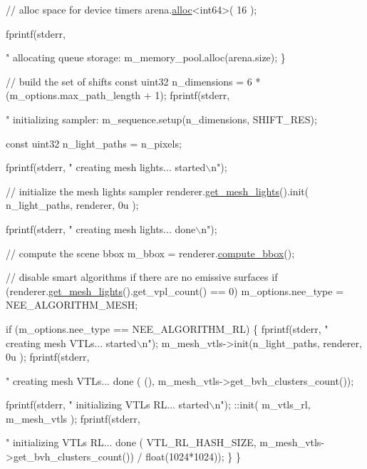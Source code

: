 \begin{DoxyCodeInclude}
{{{{{{{{{{{{        \textcolor{comment}{// alloc space for device timers}
        arena.\hyperlink{structcugar_1_1memory__arena_afcbc6673ae3fa3e61368495ed2041621}{alloc}<int64>( 16 );

        fprintf(stderr, \textcolor{stringliteral}{"  allocating queue storage: %
        m\_memory\_pool.alloc(arena.size);
    \}

    \textcolor{comment}{// build the set of shifts}
    \textcolor{keyword}{const} uint32 n\_dimensions = 6 * (m\_options.max\_path\_length + 1);
    fprintf(stderr, \textcolor{stringliteral}{"  initializing sampler: %
    m\_sequence.setup(n\_dimensions, SHIFT\_RES);

    \textcolor{keyword}{const} uint32 n\_light\_paths = n\_pixels;

    fprintf(stderr, \textcolor{stringliteral}{"  creating mesh lights... started\(\backslash\)n"});

    \textcolor{comment}{// initialize the mesh lights sampler}
    renderer.\hyperlink{struct_rendering_context_a076d2a2c86696da228fc6a49d55910ee}{get\_mesh\_lights}().init( n\_light\_paths, renderer, 0u );

    fprintf(stderr, \textcolor{stringliteral}{"  creating mesh lights... done\(\backslash\)n"});

    \textcolor{comment}{// compute the scene bbox}
    m\_bbox = renderer.\hyperlink{struct_rendering_context_acb44a2881eb6cf851f53428705a3351f}{compute\_bbox}();

    \textcolor{comment}{// disable smart algorithms if there are no emissive surfaces}
    \textcolor{keywordflow}{if} (renderer.\hyperlink{struct_rendering_context_a076d2a2c86696da228fc6a49d55910ee}{get\_mesh\_lights}().get\_vpl\_count() == 0)
        m\_options.nee\_type = NEE\_ALGORITHM\_MESH;

    if (m\_options.nee\_type == NEE\_ALGORITHM\_RL)
    \{
        fprintf(stderr, \textcolor{stringliteral}{"  creating mesh VTLs... started\(\backslash\)n"});
        m\_mesh\_vtls->init(n\_light\_paths, renderer, 0u );
        fprintf(stderr, \textcolor{stringliteral}{"  creating mesh VTLs... done (%
      (), m\_mesh\_vtls->get\_bvh\_clusters\_count());

        fprintf(stderr, \textcolor{stringliteral}{"  initializing VTLs RL... started\(\backslash\)n"});
        ::init( m\_vtls\_rl, m\_mesh\_vtls );
        fprintf(stderr, \textcolor{stringliteral}{"  initializing VTLs RL... done (%
      VTL\_RL\_HASH\_SIZE, m\_mesh\_vtls->get\_bvh\_clusters\_count()) / \textcolor{keywordtype}{float}(1024*1024));
    \}
\}

}}}}}}}}}}}}}}}}
\end{DoxyCodeInclude}
